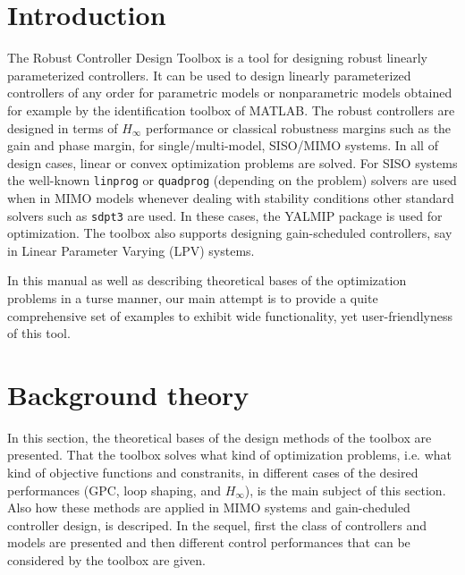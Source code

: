 \documentclass [12pt , a4paper] {article}
\begin{document}

\setlength{\parindent}{0pt}
\setlength{\parskip}{1ex plus .5ex minus 0.2ex}
\linespread{1.5}




\section{Introduction}
The Robust Controller Design Toolbox is a tool for designing robust linearly parameterized controllers. It can be used to design linearly parameterized controllers of any order for parametric models or nonparametric models obtained for example by the identification toolbox of MATLAB. The robust controllers are designed in terms of $H_\infty$ performance or classical robustness margins such as the gain and phase margin, for single/multi-model, SISO/MIMO systems. In all of design cases, linear or convex optimization problems are solved. For SISO systems the well-known \texttt{linprog} or \texttt{quadprog} (depending on the problem) solvers are used when in MIMO models whenever dealing with stability conditions other standard solvers such as \texttt{sdpt3} are used. In these cases, the YALMIP package \cite{YALMIP} is used for optimization. The toolbox also supports designing gain-scheduled controllers, say in Linear Parameter Varying (LPV) systems. 

In this manual as well as describing theoretical bases of the optimization problems in a turse manner, our main attempt is to provide a quite comprehensive set of examples to exhibit wide functionality, yet user-friendlyness of this tool.   

\section{Background theory}
In this section, the theoretical bases of the design methods of the toolbox are presented. That the toolbox solves what kind of optimization problems, i.e. what kind of objective functions and constranits, in different cases of the desired performances (GPC, loop shaping, and $H_{\infty}$), is the main subject of this section. Also how these methods are applied in MIMO systems and gain-cheduled controller design, is descriped. In the sequel, first the class of controllers and models are presented and then different control performances that can be considered by the toolbox are given.
\end{document}
